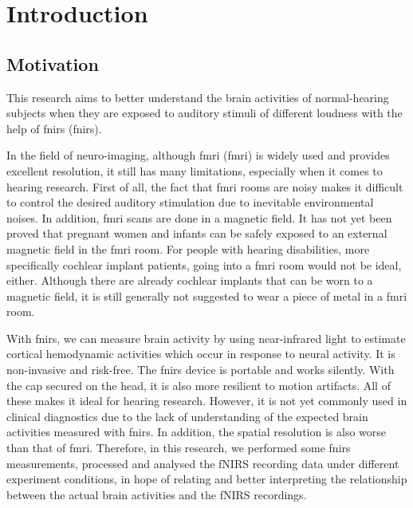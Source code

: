 \chapter{Introduction}

\section{Motivation}
This research aims to better understand the brain activities of normal-hearing subjects when they are exposed to auditory stimuli of different loudness with the help of \acrlong{fnirs} (\acrshort{fnirs}).

In the field of neuro-imaging, although \acrlong{fmri}  (\acrshort{fmri})  is widely used and provides excellent resolution, it still has many limitations, especially when it comes to hearing research. First of all, the fact that \acrshort{fmri} rooms are noisy makes it difficult to control the desired auditory stimulation due to inevitable environmental noises. In addition, \acrshort{fmri} scans are done in a magnetic field. It has not yet been proved that pregnant women and infants can be safely exposed to an external magnetic field in the \acrshort{fmri} room. For people with hearing disabilities, more specifically cochlear implant patients, going into a \acrshort{fmri} room would not be ideal, either. Although there are already cochlear implants that can be worn to a magnetic field, it is still generally not suggested to wear a piece of metal in a \acrshort{fmri} room.

With \acrshort{fnirs}, we can measure brain activity by using near-infrared light to estimate cortical hemodynamic activities which occur in response to neural activity. It is non-invasive and risk-free. The \acrshort{fnirs} device is portable and works silently. With the cap secured on the head, it is also more resilient to motion artifacts. All of these makes it ideal for hearing research. However, it is not yet commonly used in clinical diagnostics due to the lack of understanding of the expected brain activities measured with \acrshort{fnirs}. In addition, the spatial resolution is also worse than that of \acrshort{fmri}. Therefore, in this research, we performed some \acrshort{fnirs} measurements, processed and analysed the fNIRS recording data under different experiment conditions, in hope of relating and better interpreting the relationship between the actual brain activities and the fNIRS recordings.

